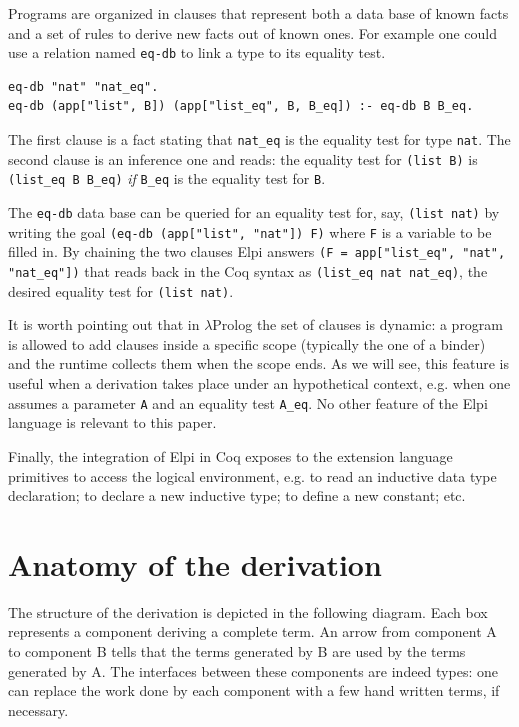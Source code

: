 \documentclass[a4paper,UKenglish,cleveref, autoref]{lipics-v2019}
\begin{document}
Programs are
organized in clauses that represent both a data base of known facts
and a set of rules to derive new facts out of known ones.
For example one could use a relation named \lstinline+eq-db+
to link a type to its equality test.
\begin{lstlisting}
eq-db "nat" "nat_eq".
eq-db (app["list", B]) (app["list_eq", B, B_eq]) :- eq-db B B_eq.
\end{lstlisting}

The first clause is a fact stating that
\lstinline+nat_eq+ is the equality test for type
\lstinline+nat+.
The second clause is an inference one and reads: the equality test
for \lstinline+(list B)+ is \lstinline+(list_eq B B_eq)+ \emph{if}
\lstinline+B_eq+ is the equality test for \lstinline+B+.

The \lstinline+eq-db+ data base can be queried for
an equality test for, say, \lstinline+(list nat)+ by writing
the goal \lstinline+(eq-db (app["list", "nat"]) F)+
where \lstinline+F+ is a variable to be filled in.
By chaining the two clauses Elpi answers
\lstinline+(F = app["list_eq", "nat", "nat_eq"])+
that reads back in the Coq syntax as
\lstinline+(list_eq nat nat_eq)+, the desired
equality test for \lstinline+(list nat)+.

It is worth pointing out that in $\lambda$Prolog the set of clauses
is dynamic: a program is allowed to add clauses inside
a specific scope (typically the one of a binder) and the runtime
collects them when the scope ends. As we will see, this feature
is useful when a derivation takes place under an hypothetical
context, e.g. when one assumes a parameter \lstinline+A+ and
an equality test \lstinline+A_eq+.
No other feature of the Elpi language is relevant to this paper.

Finally, the integration of Elpi in Coq exposes to the extension
language primitives to access the logical environment, e.g.
to read an inductive data type declaration; to declare a
new inductive type; to define a new constant; etc.

\section{Anatomy of the derivation} %
\label{sec:code}

The structure of the derivation is depicted in the following diagram.
Each box represents a component deriving a complete term.
An arrow from component A to component B tells that the terms
generated by B are used by the terms generated by A. The interfaces
between these components are indeed types: one can replace the work
done by each component with a few hand written terms, if necessary.
\end{document}
